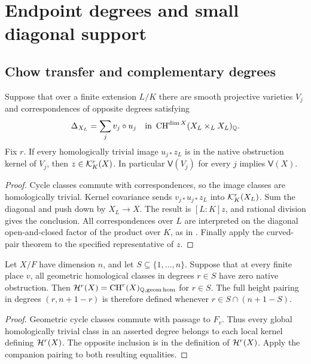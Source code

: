 \section{Endpoint degrees and small diagonal support}\label{sec:endpoints}

\subsection{Chow transfer and complementary degrees}

\begin{lemma}\label{lem:general-transfer}
Suppose that over a finite extension $L/K$ there are smooth projective
varieties $V_j$ and correspondences of opposite degrees satisfying
\[
 \Delta_{X_L}=\sum_jv_j\circ u_j
 \quad\text{in }\operatorname{CH}^{\dim X}(X_L\times_LX_L)_\mathbb Q.
\]
Fix $r$. If every homologically trivial image $u_{j*}z_L$ is in the
native obstruction kernel of $V_j$, then
$z\in\mathcal K_K^r(X)$. In particular $\mathsf V(V_j)$ for every $j$
implies $\mathsf V(X)$.
\end{lemma}

\begin{proof}
Cycle classes commute with correspondences, so the image classes are
homologically trivial. Kernel covariance sends $v_{j*}u_{j*}z_L$ into
$\mathcal K_K^r(X_L)$. Sum the diagonal and push down by $X_L\to X$.
The result is $[L:K]z$, and rational division gives the conclusion.
All correspondences over $L$ are interpreted on the diagonal
open-and-closed factor of the product over $K$, as in
. Finally apply the curved-pair theorem to the
specified representative of $z$.
\end{proof}

\begin{lemma}\label{lem:two-degrees}
Let $X/F$ have dimension $n$, and let $S\subseteq\{1,\ldots,n\}$.
Suppose that at every finite place $v$, all geometric homological
classes in degrees $r\in S$ have zero native obstruction. Then
$\mathcal H^r(X)=\operatorname{CH}^r(X)_{\mathbb Q,\mathrm{geom\,hom}}$ for $r\in S$. The full height
pairing in degrees $(r,n+1-r)$ is therefore defined whenever
$r\in S\cap(n+1-S)$.
\end{lemma}

\begin{proof}
Geometric cycle classes commute with passage to $F_v$. Thus every
global homologically trivial class in an asserted degree belongs to
each local kernel defining $\mathcal H^r(X)$. The opposite inclusion is in
the definition of $\mathcal H^r(X)$. Apply the companion pairing to both
resulting equalities.
\end{proof}

